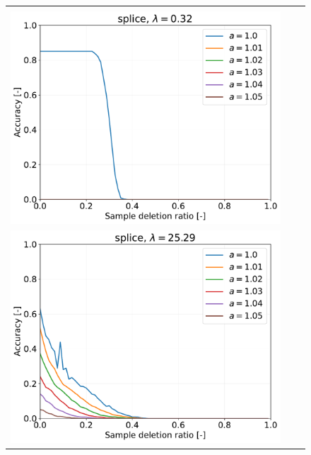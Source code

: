 \begin{figure}[H]
\begin{tabular}{ccc}
		\begin{minipage}[b]{0.3\hsize}\centering {\small Dataset: splice, $\lambda=n \cdot 10^{-3}$}\\\includegraphics[width=0.8\hsize]{fig/splice/kernel_ss_screening_rate_lam0.32_x_n_y_etest.pdf}\end{minipage}
		&
		\begin{minipage}[b]{0.3\hsize}\centering {\small Dataset: splice, $\lambda=n_\mathrm \cdot 10^{-1.5}$}\\\includegraphics[width=0.8\hsize]{fig/splice/kernel_ss_screening_rate_lam25.29_x_n_y_etest.pdf}\end{minipage}
		&

\end{tabular}
\end{figure}
